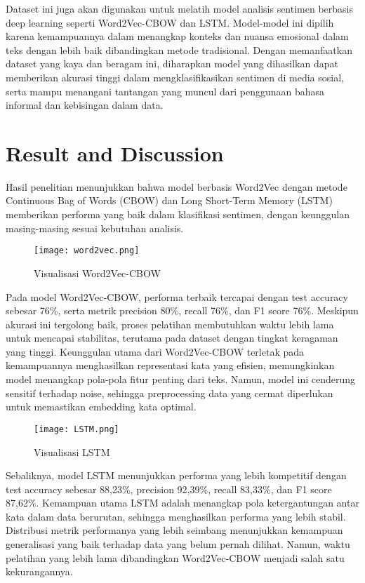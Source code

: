 \documentclass[12pt,a4paper]{article}
\begin{document}
Dataset ini juga akan digunakan untuk melatih model analisis sentimen berbasis deep learning seperti Word2Vec-CBOW dan LSTM. Model-model ini dipilih karena kemampuannya dalam menangkap konteks dan nuansa emosional dalam teks dengan lebih baik dibandingkan metode tradisional. Dengan memanfaatkan dataset yang kaya dan beragam ini, diharapkan model yang dihasilkan dapat memberikan akurasi tinggi dalam mengklasifikasikan sentimen di media sosial, serta mampu menangani tantangan yang muncul dari penggunaan bahasa informal dan kebisingan dalam data.

\section{Result and Discussion}
Hasil penelitian menunjukkan bahwa model berbasis Word2Vec dengan metode Continuous Bag of Words (CBOW) dan Long Short-Term Memory (LSTM) memberikan performa yang baik dalam klasifikasi sentimen, dengan keunggulan masing-masing sesuai kebutuhan analisis.

\begin{figure}[h!]
    \centering
    \texttt{[image: word2vec.png]}
    \caption{Visualisasi Word2Vec-CBOW}
    \label{fig:result}
\end{figure}

Pada model Word2Vec-CBOW, performa terbaik tercapai dengan test accuracy sebesar 76\%, serta metrik precision 80\%, recall 76\%, dan F1 score 76\%. Meskipun akurasi ini tergolong baik, proses pelatihan membutuhkan waktu lebih lama untuk mencapai stabilitas, terutama pada dataset dengan tingkat keragaman yang tinggi. Keunggulan utama dari Word2Vec-CBOW terletak pada kemampuannya menghasilkan representasi kata yang efisien, memungkinkan model menangkap pola-pola fitur penting dari teks. Namun, model ini cenderung sensitif terhadap noise, sehingga preprocessing data yang cermat diperlukan untuk memastikan embedding kata optimal.

\begin{figure}[h!]
    \centering
    \texttt{[image: LSTM.png]}
    \caption{Visualisasi LSTM}
    \label{fig:result}
\end{figure}

Sebaliknya, model LSTM menunjukkan performa yang lebih kompetitif dengan test accuracy sebesar 88,23\%, precision 92,39\%, recall 83,33\%, dan F1 score 87,62\%. Kemampuan utama LSTM adalah menangkap pola ketergantungan antar kata dalam data berurutan, sehingga menghasilkan performa yang lebih stabil. Distribusi metrik performanya yang lebih seimbang menunjukkan kemampuan generalisasi yang baik terhadap data yang belum pernah dilihat. Namun, waktu pelatihan yang lebih lama dibandingkan Word2Vec-CBOW menjadi salah satu kekurangannya.
\end{document}
